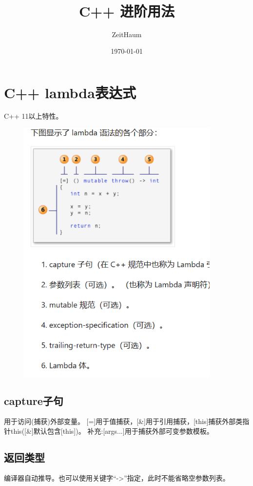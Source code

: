 \documentclass{article}
\author{ZeitHaum}
\date{\today}
\title{C++ 进阶用法}
\begin{document}
    \maketitle
    \newpage 
    \tableofcontents
    \newpage
    \setcounter{page}{1}
    \section{C++ lambda表达式}
    C++ 11以上特性。

    \begin{figure}[H]
        \centering
        \includegraphics[width = 0.9\textwidth]{fig1.png}
    \end{figure}

    \subsection{capture子句}
    用于访问(捕获)外部变量。
    [=]用于值捕获，[\&]用于引用捕获，[this]捕获外部类指针this([\&]默认包含[this])。
    补充:[args...]用于捕获外部可变参数模板。
    \subsection{返回类型}
    编译器自动推导。也可以使用关键字``->''指定，此时不能省略空参数列表。
\end{document}
